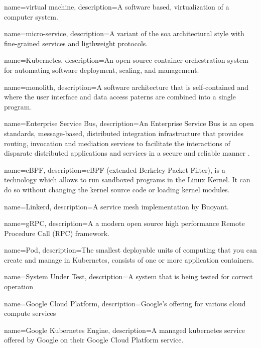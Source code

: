 {
    name={virtual machine},
    description={A software based, virtualization of a computer system.}
}

{
    name={micro-service},
    description={A variant of the \gls{soa} architectural style with fine-grained services and ligthweight protocols.}
}

{
    name={Kubernetes},
    description={An open-source \gls{container} orchestration system for automating software deployment, scaling, and management.}
}

{
    name={monolith},
    description={A software architecture that is self-contained and where the user interface and data access paterns are combined into a single program.}
}

{
    name={Enterprise Service Bus},
    description={An Enterprise Service Bus is an open standards, message-based, distributed integration infrastructure that provides routing, invocation and mediation services to facilitate the interactions of disparate distributed applications and services in a secure and reliable manner \cite{menge2007enterprise}.}
}

{
    name={eBPF},
    description={eBPF (extended Berkeley Packet Filter), is a technology which allows to run sandboxed programs in the Linux Kernel. It can do so without changing the kernel source code or loading kernel modules.}
}

{
    name={Linkerd},
    description={A service mesh implementation by Buoyant.}
}

{
    name={gRPC},
    description={A a modern open source high performance Remote Procedure Call (RPC) framework.}
}

{
    name={Pod},
    description={The smallest deployable units of computing that you can create and manage in Kubernetes, consists of one or more application containers.}
}

{
    name={System Under Test},
    description={A system that is being tested for correct operation}
}

{
    name={Google Cloud Platform},
    description={Google's offering for various cloud compute services}
}

{
    name={Google Kubernetes Engine},
    description={A managed kubernetes service offered by Google on their Google Cloud Platform service.}
}

